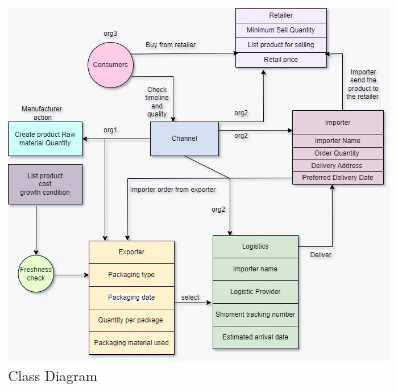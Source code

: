 \begin{figure}[htbp]
    \centering
    \includegraphics[width=0.9\textwidth]{Chapters/Chapter_5/figures/data_flow.jpg}
    \caption{Class Diagram}
    \label{fig:figure5_5}
    \end{figure}
